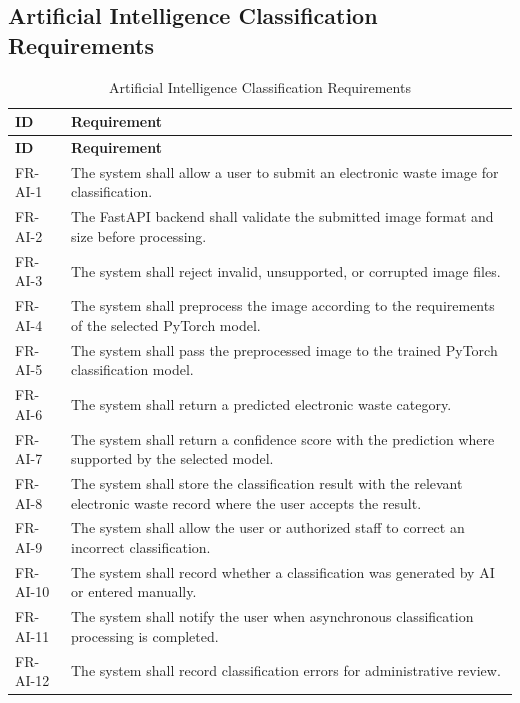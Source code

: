 \subsection{Artificial Intelligence Classification Requirements}
\begin{longtable}{@{}p{2.4cm}p{11cm}@{}}
\caption{Artificial Intelligence Classification Requirements} \label{tab:fr-ai} \\
\toprule \textbf{ID} & \textbf{Requirement} \\ \midrule
\endfirsthead
\toprule \textbf{ID} & \textbf{Requirement} \\ \midrule
\endhead
FR-AI-1 & The system shall allow a user to submit an electronic waste image for classification. \\
FR-AI-2 & The FastAPI backend shall validate the submitted image format and size before processing. \\
FR-AI-3 & The system shall reject invalid, unsupported, or corrupted image files. \\
FR-AI-4 & The system shall preprocess the image according to the requirements of the selected PyTorch model. \\
FR-AI-5 & The system shall pass the preprocessed image to the trained PyTorch classification model. \\
FR-AI-6 & The system shall return a predicted electronic waste category. \\
FR-AI-7 & The system shall return a confidence score with the prediction where supported by the selected model. \\
FR-AI-8 & The system shall store the classification result with the relevant electronic waste record where the user accepts the result. \\
FR-AI-9 & The system shall allow the user or authorized staff to correct an incorrect classification. \\
FR-AI-10 & The system shall record whether a classification was generated by AI or entered manually. \\
FR-AI-11 & The system shall notify the user when asynchronous classification processing is completed. \\
FR-AI-12 & The system shall record classification errors for administrative review. \\
\bottomrule
\end{longtable}

